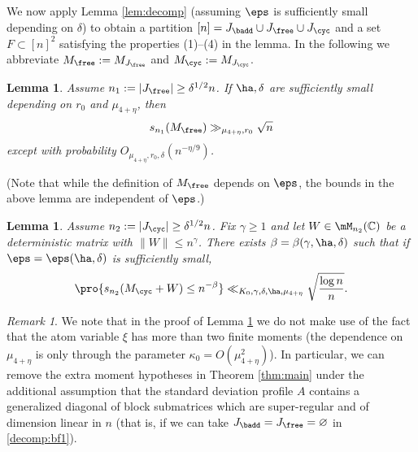 \documentclass[aop,preprint]{imsart}
\theoremstyle{plain}
\newtheorem{lemma}[theorem]{Lemma}
\theoremstyle{definition}
\theoremstyle{remark}
\newtheorem{remark}[theorem]{Remark}
\numberwithin{equation}{section}
\numberwithin{theorem}{section}
\begin{document}

We now apply Lemma \ref{lem:decomp} (assuming $\eps$ is sufficiently small depending on $\delta$) to obtain a partition $[n] = J_{\badd}\cup J_{\free} \cup J_{\cyc}$ and a set $F\subset[n]^2$ satisfying the properties (1)--(4) in the lemma. 
In the following we abbreviate $M_{\free}:= M_{J_{\free}}$ and $M_{\cyc}:= M_{J_{\cyc}}$.

\begin{lemma}		\label{lem:nil}
Assume $n_1:=|J_{\free}|\ge \delta^{1/2}n$.
If $\ha,\delta$ are sufficiently small depending on $r_0$ and 
$\mu_{4+\eta}$,
%
then
\begin{equation}
s_{n_1}(M_{\free}) \gg_{\mu_{4+\eta},r_0} \sqrt{n}
\end{equation}
except with probability $O_{\mu_{4+\eta},r_0,\delta}(n^{-\eta/9})$.
\end{lemma}

(Note that while the definition of $M_{\free}$ depends on $\eps$, the bounds in the above lemma are independent of $\eps$.)
%

\begin{lemma}		\label{lem:cyc}
Assume $n_2:=|J_{\cyc}| \ge \delta^{1/2}n$. 
Fix $\gamma\ge1$ and let $W\in \mM_{n_2}(\C)$ be a deterministic matrix with $\|W\|\le n^{\gamma}$. 
There exists $\beta= \beta(\gamma,\ha,\delta)$ such that if $\eps=\eps(\ha,\delta)$ is sufficiently small,
\begin{equation}
\pro{ s_{n_2}(M_{\cyc} + W) \le n^{-\beta}}  \ll_{K_0,\gamma,\delta,\ha,\mu_{4+\eta}}  \sqrt{\frac{\log n}{n}}.
\end{equation}
\end{lemma}

\begin{remark}	\label{rmk:relaxmom}
We note that in the proof of Lemma \ref{lem:cyc} we do not make use of the fact that the atom variable $\xi$ has more than two finite moments (the dependence on $\mu_{4+\eta}$ is only through the parameter $\kappa_0=O(\mu_{4+\eta}^2)$).
In particular, we can remove the extra moment hypotheses in Theorem \ref{thm:main} under the additional assumption that the standard deviation profile $A$ contains a generalized diagonal of block submatrices which are super-regular and of dimension linear in $n$ (that is, if we can take $J_{\badd}=J_{\free}=\varnothing$ in \eqref{decomp:bf1}). 
\end{remark}
\end{document}
